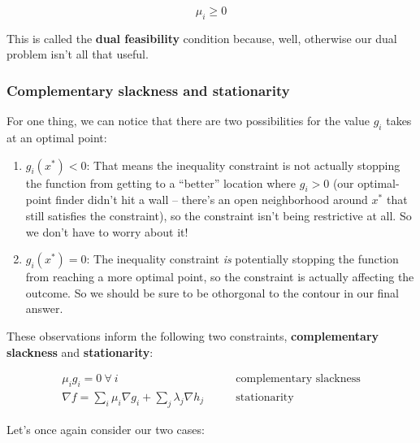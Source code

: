 \documentclass[letterpaper,12pt]{report}
\providecommand{\tightlist}{%
  \setlength{\itemsep}{0pt}\setlength{\parskip}{0pt}}
\begin{document}
\[ \mu_i \geq 0 \]

This is called the \textbf{dual feasibility} condition because, well,
otherwise our dual problem isn't all that useful.

\subsubsection{Complementary slackness and
stationarity}\label{complementary-slackness-and-stationarity}

For one thing, we can notice that there are two possibilities for the
value \(g_i\) takes at an optimal point:

\begin{enumerate}
\def\labelenumi{\arabic{enumi}.}
\item
  \(g_i(x^*) < 0\): That means the inequality constraint is not actually
  stopping the function from getting to a ``better'' location where
  \(g_i > 0\) (our optimal-point finder didn't hit a wall -- there's an
  open neighborhood around \(x^*\) that still satisfies the constraint),
  so the constraint isn't being restrictive at all. So we don't have to
  worry about it!
\item
  \(g_i(x^*) = 0\): The inequality constraint \emph{is} potentially
  stopping the function from reaching a more optimal point, so the
  constraint is actually affecting the outcome. So we should be sure to
  be othorgonal to the contour in our final answer.
\end{enumerate}

These observations inform the following two constraints,
\textbf{complementary slackness} and \textbf{stationarity}:

\[\begin{split} \mu_i g_i = 0 \ \forall \ i \qquad & \text{complementary slackness} \\
\nabla f = \sum _i \mu _i \nabla g_i + \sum _j \lambda _j \nabla h_j \qquad & \text{stationarity} \end{split}\]

Let's once again consider our two cases:
\end{document}
